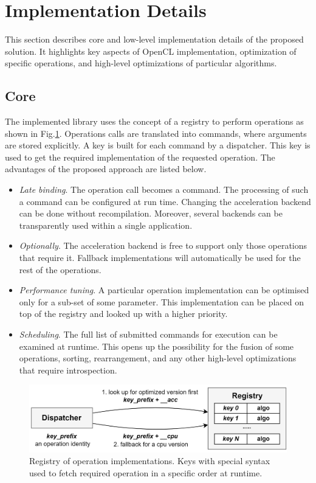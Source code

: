 \section{Implementation Details}

This section describes core and low-level implementation details of the proposed solution. 
It highlights key aspects of OpenCL implementation, optimization of specific operations, and high-level optimizations of particular algorithms.

\subsection{Core}

The implemented library uses the concept of a registry to perform operations as shown in Fig.\ref{fig:reg}. Operations calls are translated into commands, where arguments are stored explicitly. A key is built for each command by a dispatcher. This key is used to get the required implementation of the requested operation. The advantages of the proposed approach are listed below.

\begin{itemize}
    \item \textit{Late binding}. The operation call becomes a command. The processing of such a command can be configured at run time. Changing the acceleration backend can be done without recompilation. Moreover, several backends can be transparently used within a single application.
    \item \textit{Optionally}. The acceleration backend is free to support only those operations that require it. Fallback implementations will automatically be used for the rest of the operations.
    \item \textit{Performance tuning}. A particular operation implementation can be optimised only for a sub-set of some parameter. This implementation can be placed on top of the registry and looked up with a higher priority. 
    \item \textit{Scheduling}. The full list of submitted commands for execution can be examined at runtime. This opens up the possibility for the fusion of some operations, sorting, rearrangement, and any other high-level optimizations that require introspection.
\end{itemize}

\begin{figure}[]
\centering
\includegraphics[width=0.95\linewidth]{figures/registry.png}
\caption{Registry of operation implementations. Keys with special syntax used to fetch required operation in a specific order at runtime.}
\label{fig:reg}
\end{figure}

